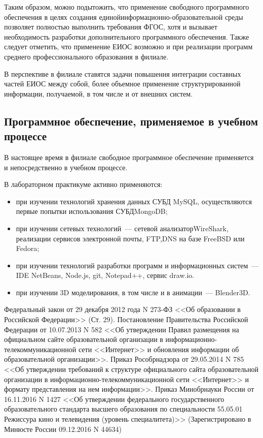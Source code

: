 \documentclass[10pt, a5paper]{article}
\begin{document}
Таким образом, можно подытожить, что применение свободного программного обеспечения в целях создания единой\linebreak информационно-образовательной среды позволяет полностью выполнить требования ФГОС, хотя и вызывает необходимость разработки дополнительного программного обеспечения. Также следует отметить, что применение ЕИОС возможно и при реализации программ среднего профессионального образования в филиале.

В перспективе в филиале ставятся задачи повышения интеграции составных частей ЕИОС между собой, более объемное применение структурированной информации, получаемой, в том числе и от внешних систем.

\subsection*{Программное обеспечение, применяемое в учебном процессе}

В настоящее время в филиале свободное программное обеспечение применяется и непосредственно в учебном процессе.

В лабораторном практикуме активно применяются:

\begin{itemize}
  \item при изучении технологий хранения данных СУБД MySQL, осуществляются первые попытки использования СУБД\linebreak MongoDB;
  \item при изучении сетевых технологий~--- сетевой анализатор\linebreak WireShark, реализации сервисов электронной почты, FTP,\linebreak DNS на базе FreeBSD или Fedora;
  \item при изучении технологий разработки программ и информационных систем~--- IDE NetBeans, Node.js, git, Notepad++, сервис draw.io.
  \item при изучении 3D моделирования, в том числе и в анимации~--- Blender3D.
\end{itemize}

\begin{thebibliography}{20}
 Федеральный закон от 29 декабря 2012 года N 273-ФЗ <<Об образовании в Российской Федерации>> (Ст. 29).
 Постановление Правительства Российской Федерации от 10.07.2013 N 582 <<Об утверждении Правил размещения на официальном сайте образовательной организации в информационно-телекоммуникационной сети <<Интернет>> и обновления информации об образовательной организации>>.
 Приказ Рособрнадзора от 29.05.2014 N 785 <<Об утверждении требований к структуре официального сайта образовательной организации в информационно-телекоммуникационной сети <<Интернет>> и формату представления на нем информации>>.
 Приказ Минобрнауки России от 16.11.2016 N 1427 <<Об утверждении федерального государственного образовательного стандарта высшего образования по специальности 55.05.01 Режиссура кино и телевидения (уровень специалитета)>> (Зарегистрировано в Минюсте России 09.12.2016 N 44634)
\end{thebibliography}
\end{document}
